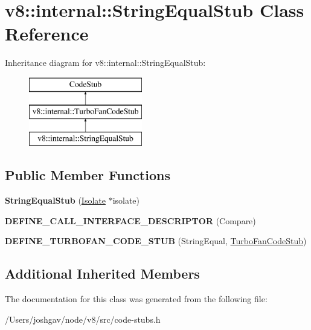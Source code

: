\hypertarget{classv8_1_1internal_1_1_string_equal_stub}{}\section{v8\+:\+:internal\+:\+:String\+Equal\+Stub Class Reference}
\label{classv8_1_1internal_1_1_string_equal_stub}
Inheritance diagram for v8\+:\+:internal\+:\+:String\+Equal\+Stub\+:\begin{figure}[H]
\begin{center}
\leavevmode
\includegraphics[height=3.000000cm]{classv8_1_1internal_1_1_string_equal_stub}
\end{center}
\end{figure}
\subsection*{Public Member Functions}
\begin{DoxyCompactItemize}
\item 
{\bfseries String\+Equal\+Stub} (\hyperlink{classv8_1_1internal_1_1_isolate}{Isolate} $\ast$isolate)\hypertarget{classv8_1_1internal_1_1_string_equal_stub_a22dba4ea51d92c89718ef1f6b3e4f831}{}\label{classv8_1_1internal_1_1_string_equal_stub_a22dba4ea51d92c89718ef1f6b3e4f831}

\item 
{\bfseries D\+E\+F\+I\+N\+E\+\_\+\+C\+A\+L\+L\+\_\+\+I\+N\+T\+E\+R\+F\+A\+C\+E\+\_\+\+D\+E\+S\+C\+R\+I\+P\+T\+OR} (Compare)\hypertarget{classv8_1_1internal_1_1_string_equal_stub_adbf70f146fa670a7e4d6bead24765417}{}\label{classv8_1_1internal_1_1_string_equal_stub_adbf70f146fa670a7e4d6bead24765417}

\item 
{\bfseries D\+E\+F\+I\+N\+E\+\_\+\+T\+U\+R\+B\+O\+F\+A\+N\+\_\+\+C\+O\+D\+E\+\_\+\+S\+T\+UB} (String\+Equal, \hyperlink{classv8_1_1internal_1_1_turbo_fan_code_stub}{Turbo\+Fan\+Code\+Stub})\hypertarget{classv8_1_1internal_1_1_string_equal_stub_a7d7fa8bfcb552ae46b065752cd16d138}{}\label{classv8_1_1internal_1_1_string_equal_stub_a7d7fa8bfcb552ae46b065752cd16d138}

\end{DoxyCompactItemize}
\subsection*{Additional Inherited Members}


The documentation for this class was generated from the following file\+:\begin{DoxyCompactItemize}
\item 
/\+Users/joshgav/node/v8/src/code-\/stubs.\+h\end{DoxyCompactItemize}
